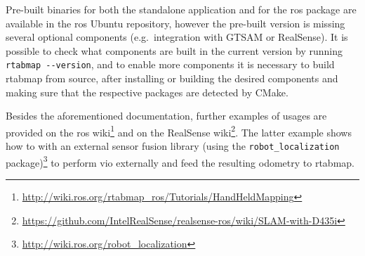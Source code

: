 \documentclass[11pt, letterpaper, twoside]{article}
\begin{document}
Pre-built binaries for both the standalone application and for the \gls{ros}
package are available in the \gls{ros} Ubuntu repository, however the pre-built
version is missing several optional components (e.g.~integration with GTSAM or
RealSense). It is possible to check what components are built in the current
version by running \texttt{rtabmap -{}-version}, and to enable more components
it is necessary to build \gls{rtabmap} from source, after installing or
building the desired components and making sure that the respective packages
are detected by CMake.

Besides the aforementioned documentation, further examples of usages are
provided on the \gls{ros}
wiki\footnote{\url{http://wiki.ros.org/rtabmap_ros/Tutorials/HandHeldMapping}}
and on the RealSense
wiki\footnote{\url{https://github.com/IntelRealSense/realsense-ros/wiki/SLAM-with-D435i}}.
The latter example shows how to with an external sensor
fusion library (using the \texttt{robot\_localization}
package)\footnote{\url{http://wiki.ros.org/robot_localization}} to perform
\gls{vio} externally and feed the resulting odometry to \gls{rtabmap}.


\end{document}
